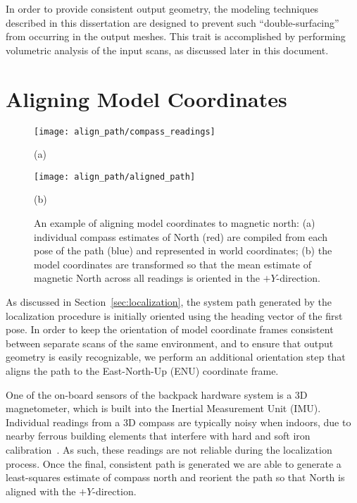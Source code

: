 \documentclass[12pt,onecolumn,oneside]{book}
\begin{document}
In order to provide consistent output geometry, the modeling techniques described in this dissertation are designed to prevent such ``double-surfacing'' from occurring in the output meshes.  This trait is accomplished by performing volumetric analysis of the input scans, as discussed later in this document. 

\section{Aligning Model Coordinates}
\label{sec:align_path}

\begin{figure}
	\begin{minipage}[t]{0.5\linewidth}
		\centerline{\texttt{[image: align\_path/compass\_readings]}}
		\centerline{(a)}
	\end{minipage}
	\hfill
	\begin{minipage}[t]{0.5\linewidth}
		\centerline{\texttt{[image: align\_path/aligned\_path]}}
		\centerline{(b)}
	\end{minipage}

	\caption[Aligning model coordinate system with North.]{An example of aligning model coordinates to magnetic north:  (a) individual compass estimates of North (red) are compiled from each pose of the path (blue) and represented in world coordinates; (b) the model coordinates are transformed so that the mean estimate of magnetic North across all readings is oriented in the $+Y$-direction.}
	\label{fig:align_path}
\end{figure}

As discussed in Section~\ref{sec:localization}, the system path generated by the localization procedure is initially oriented using the heading vector of the first pose.  In order to keep the orientation of model coordinate frames consistent between separate scans of the same environment, and to ensure that output geometry is easily recognizable, we perform an additional orientation step that aligns the path to the East-North-Up (ENU) coordinate frame.

One of the on-board sensors of the backpack hardware system is a 3D magnetometer, which is built into the Inertial Measurement Unit (IMU).  Individual readings from a 3D compass are typically noisy when indoors, due to nearby ferrous building elements that interfere with hard and soft iron calibration~\cite{Caruso00,Guo08}.  As such, these readings are not reliable during the localization process.  Once the final, consistent path is generated we are able to generate a least-squares estimate of compass north and reorient the path so that North is aligned with the $+Y$-direction.
\end{document}
